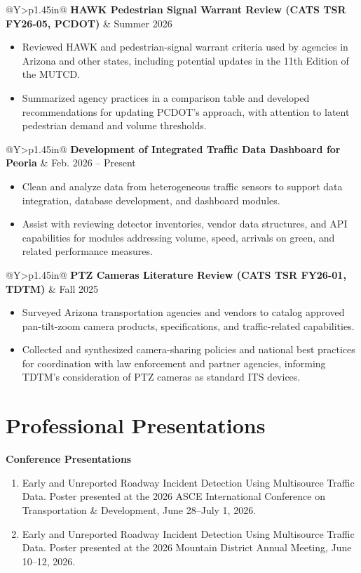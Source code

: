 \documentclass[10pt,letterpaper]{article}
\makeatletter
\newcommand{\projectheading}[2]{%
  \Needspace{7\baselineskip}%
  \begin{tabularx}{\linewidth}{@{}Y>{\raggedleft\arraybackslash}p{1.45in}@{}}
    \textbf{#1} & #2
  \end{tabularx}
}
\newenvironment{cvitems}{%
  \begin{itemize}[
    leftmargin=15pt,
    label=\textbullet,
    labelsep=6pt,
    topsep=2pt,
    itemsep=1.5pt,
    parsep=0pt,
    partopsep=0pt
  ]
}{\end{itemize}}
\newenvironment{cvnumbers}{%
  \begin{enumerate}[
    leftmargin=18pt,
    label=\arabic*.,
    labelsep=5pt,
    topsep=2pt,
    itemsep=2pt,
    parsep=0pt,
    partopsep=0pt
  ]
}{\end{enumerate}}
\newcommand{\projectspace}{\vspace{4pt}}
\makeatother
\begin{document}
\projectspace
\projectheading
  {HAWK Pedestrian Signal Warrant Review (CATS TSR FY26-05, PCDOT)}
  {Summer 2026}
\begin{cvitems}
  \item Reviewed HAWK and pedestrian-signal warrant criteria used by agencies in Arizona and other states, including potential updates in the 11th Edition of the MUTCD.
  \item Summarized agency practices in a comparison table and developed recommendations for updating PCDOT's approach, with attention to latent pedestrian demand and volume thresholds.
\end{cvitems}

\projectspace
\projectheading
  {Development of Integrated Traffic Data Dashboard for Peoria}
  {Feb. 2026 -- Present}
\begin{cvitems}
  \item Clean and analyze data from heterogeneous traffic sensors to support data integration, database development, and dashboard modules.
  \item Assist with reviewing detector inventories, vendor data structures, and API capabilities for modules addressing volume, speed, arrivals on green, and related performance measures.
\end{cvitems}

\projectspace
\projectheading
  {PTZ Cameras Literature Review (CATS TSR FY26-01, TDTM)}
  {Fall 2025}
\begin{cvitems}
  \item Surveyed Arizona transportation agencies and vendors to catalog approved pan-tilt-zoom camera products, specifications, and traffic-related capabilities.
  \item Collected and synthesized camera-sharing policies and national best practices for coordination with law enforcement and partner agencies, informing TDTM's consideration of PTZ cameras as standard ITS devices.
\end{cvitems}

\section{Professional Presentations}

\textbf{Conference Presentations}\par
\begin{cvnumbers}
  \item Early and Unreported Roadway Incident Detection Using Multisource Traffic Data. Poster presented at the 2026 ASCE International Conference on Transportation \& Development, June 28--July 1, 2026.
  \item Early and Unreported Roadway Incident Detection Using Multisource Traffic Data. Poster presented at the 2026 Mountain District Annual Meeting, June 10--12, 2026.
\end{cvnumbers}
\end{document}
